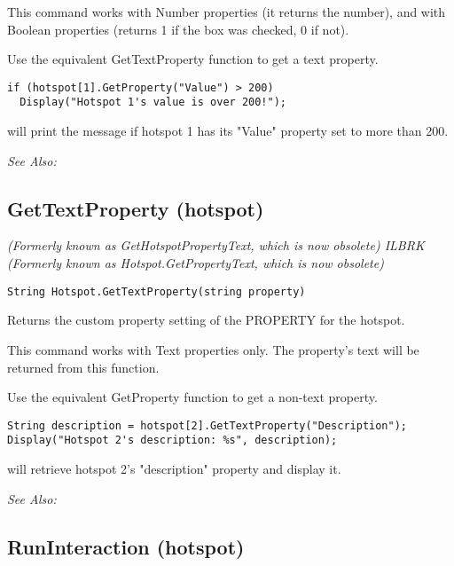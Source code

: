 This command works with Number properties (it returns the number), and with Boolean
properties (returns 1 if the box was checked, 0 if not).

Use the equivalent GetTextProperty function to get a text property.

\begin{verbatim}
if (hotspot[1].GetProperty("Value") > 200)
  Display("Hotspot 1's value is over 200!");
\end{verbatim}
will print the message if hotspot 1 has its "Value" property set to more than 200.

\it{See Also:} 


\subsection{GetTextProperty (hotspot)}\label{Hotspot.GetTextProperty}%

\it{(Formerly known as GetHotspotPropertyText, which is now obsolete)} ILBRK
\it{(Formerly known as Hotspot.GetPropertyText, which is now obsolete)}

\begin{verbatim}
String Hotspot.GetTextProperty(string property)
\end{verbatim}
Returns the custom property setting of the PROPERTY for the hotspot.

This command works with Text properties only. The property's text will be
returned from this function.

Use the equivalent GetProperty function to get a non-text property.

\begin{verbatim}
String description = hotspot[2].GetTextProperty("Description");
Display("Hotspot 2's description: %s", description);
\end{verbatim}
will retrieve hotspot 2's "description" property and display it.

\it{See Also:} 



\subsection{RunInteraction (hotspot)}\label{Hotspot.RunInteraction}%

